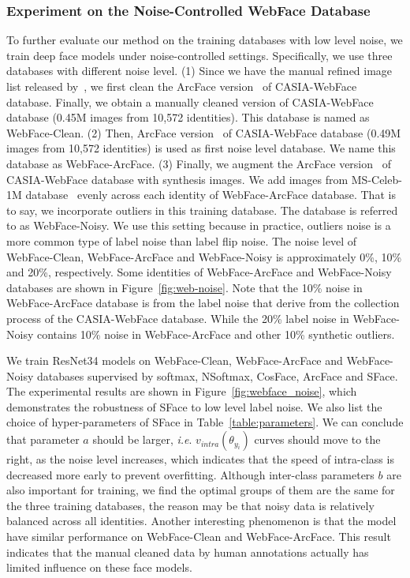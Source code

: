 \documentclass[journal,comsoc]{IEEEtran}
\begin{document}
\subsubsection{Experiment on the Noise-Controlled WebFace Database}
To further evaluate our method on the training databases with low level noise, we train deep face models under noise-controlled settings. Specifically, we use three databases with different noise level. (1) Since we have the manual refined image list released by~\cite{rwebface_wang}, we first clean the ArcFace version~\cite{deng2019arcface} of CASIA-WebFace database. Finally, we obtain a manually cleaned version of CASIA-WebFace database (0.45M images from 10,572 identities). This database is named as WebFace-Clean. (2) Then, ArcFace version~\cite{deng2019arcface} of CASIA-WebFace database (0.49M images from 10,572 identities) is used as first noise level database. We name this database as WebFace-ArcFace. (3) Finally, we augment the ArcFace version~\cite{deng2019arcface} of CASIA-WebFace database with synthesis images. We add images from MS-Celeb-1M database~\cite{guo2016msceleb} evenly across each identity of WebFace-ArcFace database. That is to say, we incorporate outliers in this training database. The database is referred to as WebFace-Noisy. We use this setting because in practice, outliers noise is a more common type of label noise than label flip noise. The noise level of WebFace-Clean, WebFace-ArcFace and WebFace-Noisy is approximately 0\%, 10\% and 20\%, respectively. Some identities of WebFace-ArcFace and WebFace-Noisy databases are shown in Figure~\ref{fig:web-noise}. Note that the 10\% noise in WebFace-ArcFace database is from the label noise that derive from the collection process of the CASIA-WebFace database. While the 20\% label noise in WebFace-Noisy contains 10\% noise in WebFace-ArcFace and other 10\% synthetic outliers. 

We train ResNet34 models on WebFace-Clean, WebFace-ArcFace and WebFace-Noisy databases supervised by softmax, NSoftmax, CosFace, ArcFace and SFace. The experimental results are shown in Figure~\ref{fig:webface_noise}, which demonstrates the robustness of SFace to low level label noise. We also list the choice of hyper-parameters of SFace in Table~\ref{table:parameters}. We can conclude that parameter $a$ should be larger, \emph{i.e}. ${v_{intra}}\left( {{\theta _{{y_i}}}} \right)$ curves should move to the right, as the noise level increases, which indicates that the speed of intra-class is decreased more early to prevent overfitting. Although inter-class parameters $b$ are also important for training, we find the optimal groups of them are the same for the three training databases, the reason may be that noisy data is relatively balanced across all identities. Another interesting phenomenon is that the model have similar performance on WebFace-Clean and WebFace-ArcFace. This result indicates that the manual cleaned data by human annotations actually has limited influence on these face models. 
\end{document}
